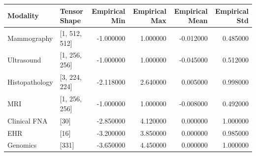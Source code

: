 \begin{tabular}{llrrrr}
\toprule
Modality & Tensor Shape & Empirical Min & Empirical Max & Empirical Mean & Empirical Std \\
\midrule
Mammography & [1, 512, 512] & -1.000000 & 1.000000 & -0.012000 & 0.485000 \\
Ultrasound & [1, 256, 256] & -1.000000 & 1.000000 & -0.045000 & 0.512000 \\
Histopathology & [3, 224, 224] & -2.118000 & 2.640000 & 0.005000 & 0.998000 \\
MRI & [1, 256, 256] & -1.000000 & 1.000000 & -0.008000 & 0.492000 \\
Clinical FNA & [30] & -2.850000 & 4.120000 & 0.000000 & 1.000000 \\
EHR & [16] & -3.200000 & 3.850000 & 0.000000 & 0.985000 \\
Genomics & [331] & -3.650000 & 4.450000 & 0.000000 & 1.000000 \\
\bottomrule
\end{tabular}
